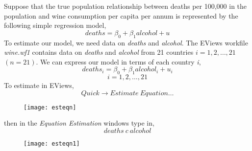 \documentclass[12pt]{report}
\begin{document}
		
		\noindent Suppose that the true population relationship between deaths per 100,000 in the population and wine consumption per capita per annum is represented by the following simple regression model,
		\begin{equation}
			deaths = \beta_0 + \beta_1alcohol + u \label{eq:3}
		\end{equation}
		To estimate our model, we need data on \textit{deaths} and \textit{alcohol}. The EViews workfile \textit{wine.wf1} contains data on \textit{deaths} and \textit{alcohol} from 21 countries $i = 1, 2, \dots, 21$ $(n=21)$. We can express our model in terms of each country \textit{i},
		\begin{equation}
			deaths_i = \beta_0 + \beta_1alcohol_i + u_i \label{eq:4}
		\end{equation}
		$$i = 1, 2, \dots, 21$$
		To estimate in EViews,
		$$Quick \to Estimate\ Equation\dots$$
		\begin{figure}[H]
			\centering
			\texttt{[image: esteqn]}
		\end{figure}
		\vspace{-\baselineskip}
		\noindent then in the \textit{Equation Estimation} windows type in,
		$$deaths\ c\ alcohol$$
		\begin{figure}[H]
			\centering
			\texttt{[image: esteqn1]}
		\end{figure}
		\vspace{-\baselineskip}		
\end{document}
